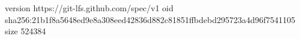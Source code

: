 version https://git-lfs.github.com/spec/v1
oid sha256:21b1f8a5648ed9e8a308eed42836d882c81851ffbdebd295723a4d96f7541105
size 524384
